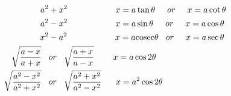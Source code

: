 \begin{align*}
\hspace{20mm} a^2 &+ x^2 \hspace{20mm} x=a\tan\theta \hspace{5mm} or \hspace{5mm} x=a\cot\theta\\
\hspace{20mm}  a^2 &- x^2  \hspace{20mm} x=a\sin\theta \hspace{5mm} or \hspace{5mm} x=a\cos\theta\\
\hspace{20mm}  x^2 &- a^2  \hspace{20mm} x=a \mathrm{cosec}\theta \hspace{3mm} or \hspace{5mm} x=a\sec\theta \\
\hspace{25mm}  \sqrt{\frac{a-x}{a+x}} \hspace{3mm}  &or \hspace{3mm}\sqrt{\frac{a+x}{a-x}}  \hspace{8mm} x=a\cos2\theta \hspace{5mm}\\
\hspace{25mm}  \sqrt{\frac{a^2-x^2}{a^2+x^2}} \hspace{3mm} &or \hspace{3mm}\sqrt{\frac{a^2+x^2}{a^2-x^2}}  \hspace{6mm} x=a^2\cos2\theta \hspace{5mm}
\end{align*}

